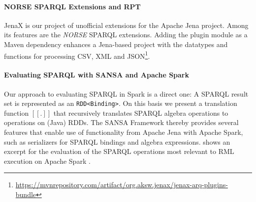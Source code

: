 \paragraph{NORSE SPARQL Extensions and RPT}
JenaX is our project of unofficial extensions for the Apache Jena project. Among its features are the \emph{NORSE} SPARQL extensions. Adding the plugin module as a Maven dependency enhances a Jena-based project with the datatypes and functions for processing CSV, XML and JSON\footnote{\url{https://mvnrepository.com/artifact/org.aksw.jenax/jenax-arq-plugins-bundle}}.

\paragraph{Evaluating SPARQL with SANSA and Apache Spark}
Our approach to evaluating SPARQL in Spark is a direct one: A SPARQL result set is represented as an \lstinline{RDD<Binding>}.
On this basis we present a translation function $[[.]]$ that recursively translates SPARQL algebra operations to operations on (Java) RDDs.
The SANSA Framework thereby provides several features that enable use of functionality from Apache Jena with Apache Spark, such as serializers for SPARQL bindings and algebra expressions.  shows an excerpt for the evaluation of the SPARQL operations most relevant to RML execution on Apache Spark .


